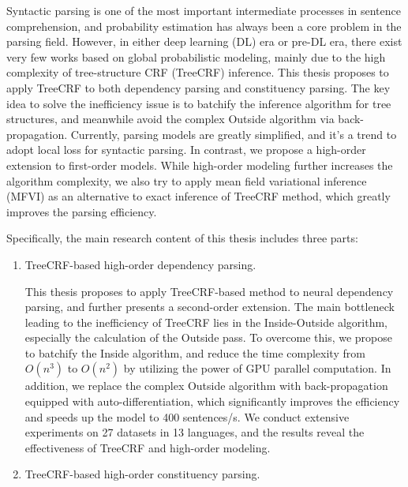 
\begin{eabstract}
	Syntactic parsing is one of the most important intermediate processes in sentence comprehension,
	and probability estimation has always been a core problem in the parsing field.
	However, in either deep learning (DL) era or pre-DL era, there exist very few works based on global probabilistic modeling, mainly due to the high complexity of tree-structure CRF (TreeCRF) inference.
	This thesis proposes to apply TreeCRF to both dependency parsing and constituency parsing.
	The key idea to solve the inefficiency issue is to batchify the inference algorithm for tree structures, and meanwhile avoid the complex Outside algorithm via back-propagation.
	Currently, parsing models are greatly simplified, and it's a trend to adopt local loss for syntactic parsing.
	In contrast, we propose a high-order extension to first-order models.
	While high-order modeling further increases the algorithm complexity, we also try to apply mean field variational inference (MFVI) as an alternative to exact inference of TreeCRF method, which greatly improves the parsing efficiency.
	
	Specifically, the main research content of this thesis includes three parts:
	
	\begin{enumerate}
		
		\item TreeCRF-based high-order dependency parsing.
		      
		      This thesis proposes to apply TreeCRF-based method to neural dependency parsing, and further presents a second-order extension.
		      The main bottleneck leading to the inefficiency of TreeCRF lies in the Inside-Outside algorithm, especially the calculation of the Outside pass.
		      To overcome this, we propose to batchify the Inside algorithm, and reduce the time complexity from $O(n^3)$ to $O(n^2)$ by utilizing the power of GPU parallel computation.
		      In addition, we replace the complex Outside algorithm with back-propagation equipped with auto-differentiation, which significantly improves the efficiency and speeds up the model to 400 sentences/s.
		      We conduct extensive experiments on 27 datasets in 13 languages, and the results reveal the effectiveness of TreeCRF and high-order modeling.
		      
		\item TreeCRF-based high-order constituency parsing.
		      

\end{enumerate}
\end{eabstract}
